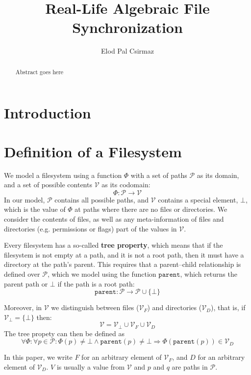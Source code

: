 \documentclass[12pt]{article}
\title{Real-Life Algebraic File Synchronization}
\author{Elod Pal Csirmaz}
\newcommand{\setv}{\mathcal{V}}
\newcommand{\setvx}[1]{\mathcal{V}_{#1}}
\newcommand{\setf}{\setvx{F}}
\newcommand{\setd}{\setvx{D}}
\newcommand{\setb}{\setvx{\empt}}
\newcommand{\setp}{\mathcal{P}}
\newcommand{\empt}{\bot}
\newcommand{\parent}{\mathtt{parent}}
\newcommand{\FS}{\Phi} %
\begin{document}
\maketitle
\begin{abstract}
Abstract goes here
\end{abstract}

\section{Introduction}


\section{Definition of a Filesystem}

We model a filesystem using a function $\FS$ with a set of paths $\setp$ as its domain,
and a set of possible contents $\setv$ as its codomain:
\[ \FS : \setp \rightarrow \setv \] 
In our model, $\setp$ contains all possible paths, and $\setv$ contains a special
element, $\empt$, which is the value of $\FS$ at paths where there are no files
or directories.
We consider the contents of files, as well as any meta-information of files
and directories (e.g. permissions or flags) part of the values in $\setv$.

Every filesystem has a so-called \textbf{tree property}, which means that
if the filesystem is not empty at a path, and it is not a root path,
then it must have a directory at the path's parent.
This requires that a parent--child relationship is defined over $\setp$,
which we model using the function $\parent$, which returns the parent path
or $\empt$ if the path is a root path:
\[ \parent : \setp \rightarrow \setp \cup \{\empt\} \]

Moreover, in $\setv$ we distinguish between files ($\setf$) and directories ($\setd$), that is,
if $\setb = \{\empt\}$ then:
\[ \setv = \setb \cup \setf \cup \setd \]
The tree propety can then be defined as
\[ \forall \FS : \forall p\in\setp : \FS(p) \neq \empt \wedge \parent(p) \neq \empt \Rightarrow \FS(\parent(p)) \in \setd \]


In this paper, we write $F$ for an arbitrary element of $\setf$, and $D$ for an arbitrary element
of $\setd$. $V$ is usually a value from $\setv$ and $p$ and $q$ are paths in $\setp$.
\end{document}

